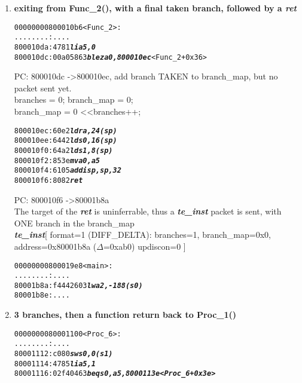 \begin{enumerate}
\item
  \textbf{exiting from Func\_2(), with a final taken branch, followed by a \textit{ret}}
  \begin {alltt}
00000000800010b6 <Func\_2>:
    ........:   ....
    800010da:	4781                    \textbf{\textit{li	a5,0}}
    800010dc:	00a05863                \textbf{\textit{blez	a0,800010ec}} <Func\_2+0x36>
  \end{alltt}

  \begin{frame}

    PC: 800010dc -\textgreater 800010ec, add branch TAKEN to branch\_map, but no packet sent yet.\\
    branches = 0; branch\_map = 0;\\
    branch\_map \textbar= 0 \textless\textless branches++;
  \end{frame}

  \begin {alltt}
    800010ec:   60e2                    \textbf{\textit{ld      ra,24(sp)}}
    800010ee:   6442                    \textbf{\textit{ld      s0,16(sp)}}
    800010f0:   64a2                    \textbf{\textit{ld      s1,8(sp)}}
    800010f2:   853e                    \textbf{\textit{mv      a0,a5}}
    800010f4:   6105                    \textbf{\textit{addi    sp,sp,32}}
    800010f6:   8082                    \textbf{\textit{ret}}
    \end{alltt}

  \begin{frame}

    PC: 800010f6 -\textgreater 80001b8a\\
    The target of the \textbf{\textit{ret}} is uninferrable, thus a \textbf{\textit{te\_inst}} packet is sent, with ONE branch in the branch\_map\\
    \textbf{\textit{te\_inst}}[ format=1 (DIFF\_DELTA): branches=1, branch\_map=0x0, address=0x80001b8a ($\Delta$=0xab0) updiscon=0 ]
  \end {frame}
  
  \begin {alltt}
00000000800019e8 <main>:
    ........:   ....
    80001b8a:	f4442603                \textbf{\textit{lw      a2,-188(s0)}}
    80001b8e:	....
  \end{alltt}
  
\item
  \textbf{3 branches, then a function return back to Proc\_1()}

  \begin {alltt}
0000000080001100 <Proc\_6>:
    ........:   ....
    80001112:	c080                    \textbf{\textit{sw	s0,0(s1)}}
    80001114:	4785                    \textbf{\textit{li	a5,1}}
    80001116:	02f40463                \textbf{\textit{beq	s0,a5,8000113e <Proc_6+0x3e>}}
  \end{alltt}
  

\end{enumerate}

